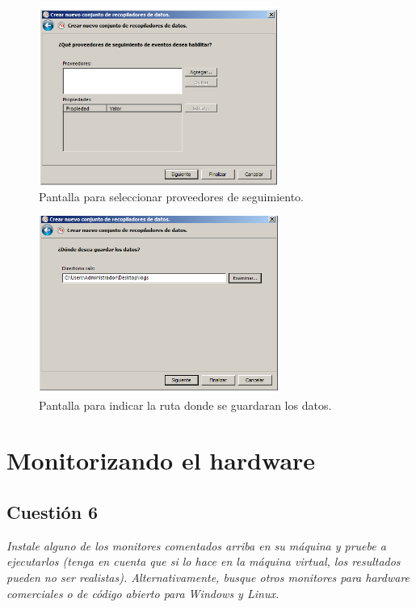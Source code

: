 \begin{figure}[H]
  \begin{center}
    \includegraphics[width=0.7\textwidth]{imagenes/rec6}
    \caption{Pantalla para seleccionar proveedores de seguimiento.}
    \label{fig11}
  \end{center}
\end{figure}

\begin{figure}[H]
  \begin{center}
    \includegraphics[width=0.7\textwidth]{imagenes/rec7}
    \caption{Pantalla para indicar la ruta donde se guardaran los datos.}
    \label{fig12}
  \end{center}
\end{figure}



\section{Monitorizando el hardware}
\subsection{Cuestión 6}
\textit{Instale alguno de los monitores comentados arriba en su máquina y pruebe a ejecutarlos (tenga en cuenta que si lo hace en la máquina virtual, los resultados pueden no ser realistas). Alternativamente, busque otros monitores para hardware comerciales o de código abierto para Windows y Linux.}
\newline

